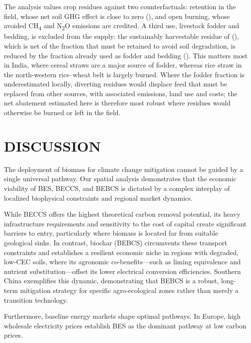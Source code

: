 \documentclass[
  letterpaper,
]{article}
\begin{document}
The analysis values crop residues against two counterfactuals: retention
in the field, whose net soil GHG effect is close to zero
(), and open burning, whose
avoided CH\textsubscript{4} and N\textsubscript{2}O emissions are
credited. A third use, livestock fodder and bedding, is excluded from
the supply: the sustainably harvestable residue of
(), which is net of the fraction that
must be retained to avoid soil degradation, is reduced by the fraction
already used as fodder and bedding
(). This matters most in India,
where cereal straws are a major source of fodder, whereas rice straw in
the north-western rice--wheat belt is largely burned. Where the fodder
fraction is underestimated locally, diverting residues would displace
feed that must be replaced from other sources, with associated
emissions, land use and costs; the net abatement estimated here is
therefore most robust where residues would otherwise be burned or left
in the field.

\section{DISCUSSION}\label{discussion}

The deployment of biomass for climate change mitigation cannot be guided
by a single universal pathway. Our spatial analysis demonstrates that
the economic viability of BES, BECCS, and BEBCS is dictated by a complex
interplay of localized biophysical constraints and regional market
dynamics.

While BECCS offers the highest theoretical carbon removal potential, its
heavy infrastructure requirements and sensitivity to the cost of capital
create significant barriers to entry, particularly where biomass is
located far from suitable geological sinks. In contrast, biochar (BEBCS)
circumvents these transport constraints and establishes a resilient
economic niche in regions with degraded, low-CEC soils, where its
agronomic co-benefits---such as liming equivalence and nutrient
substitution---offset its lower electrical conversion efficiencies.
Southern China exemplifies this dynamic, demonstrating that BEBCS is a
robust, long-term mitigation strategy for specific agro-ecological zones
rather than merely a transition technology.

Furthermore, baseline energy markets shape optimal pathways. In Europe,
high wholesale electricity prices establish BES as the dominant pathway
at low carbon prices.
\end{document}
